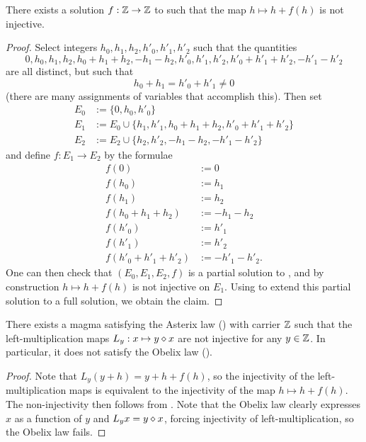 \begin{corollary}\label{no-inject}  There exists a solution $f:\mathbb{Z} \to \mathbb{Z}$ to  such that the map $h \mapsto h + f(h)$ is not injective.
\end{corollary}

\begin{proof}  Select integers $h_0,h_1,h_2,h'_0,h'_1,h'_2$ such that the quantities
  $$ 0, h_0, h_1, h_2, h_0+h_1+h_2, -h_1-h_2, h'_0, h'_1, h'_2, h'_0+h'_1+h'_2, -h'_1-h'_2$$
  are all distinct, but such that
  $$ h_0 + h_1 = h'_0 + h'_1 \neq 0$$
  (there are many assignments of variables that accomplish this).  Then set
\begin{align*}
  E_0 &:= \{0,h_0, h'_0\}\\
  E_1 &:= E_0 \cup \{ h_1, h'_1, h_0+h_1+h_2, h'_0+h'_1+h'_2\}\\
  E_2 &:= E_2 \cup \{ h_2, h'_2, -h_1-h_2, -h'_1-h'_2\}
\end{align*}
and define $f: E_1 \to E_2$ by the formulae
\begin{align*}
  f(0) &:= 0 \\
  f(h_0) &:= h_1 \\
  f(h_1) &:= h_2 \\
  f(h_0+h_1+h_2) &:= -h_1-h_2 \\
  f(h'_0) &:= h'_1 \\
  f(h'_1) &:= h'_2 \\
  f(h'_0+h'_1+h'_2) &:= -h'_1-h'_2.
\end{align*}
One can then check that $(E_0, E_1, E_2, f)$ is a partial solution to , and by construction $h \mapsto h + f(h)$ is not injective on $E_1$.  Using  to extend this partial solution to a full solution, we obtain the claim.
\end{proof}

\begin{corollary}\label{asterix-obelix}  There exists a magma satisfying the Asterix law () with carrier $\mathbb{Z}$ such that the left-multiplication maps $L_y: x \mapsto y \diamond x$ are not injective for any $y \in \mathbb{Z}$.  In particular, it does not satisfy the Obelix law ().
\end{corollary}

\begin{proof} Note that $L_y (y+h) = y + h + f(h)$, so the injectivity of the left-multiplication maps is equivalent to the injectivity of the map $h \mapsto h + f(h)$.  The non-injectivity then follows from . Note that the Obelix law clearly expresses $x$ as a function of $y$ and $L_y x = y \diamond x$, forcing injectivity of left-multiplication, so the Obelix law fails.
\end{proof}


